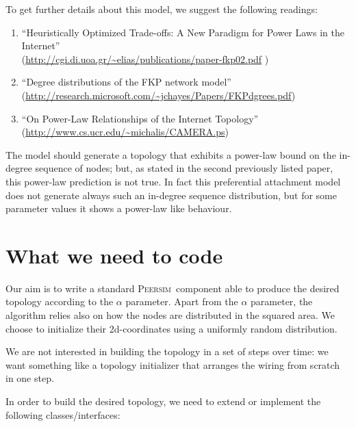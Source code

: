 \documentclass[a4paper,11pt]{article}
\newcommand{\id}[1]{{\scshape\small #1}}
\newcommand{\psim}{\id{Peersim}}
\begin{document}
To get further details about this model, we suggest the following
readings:

\begin{enumerate}

\item ``Heuristically Optimized Trade-offs: A New Paradigm for Power
Laws in the Internet'' \\
(\url{http://cgi.di.uoa.gr/~elias/publications/paper-fkp02.pdf} )

\item  ``Degree distributions
of the FKP network model'' \\
(\url{http://research.microsoft.com/~jchayes/Papers/FKPdgrees.pdf}) 

\item ``On Power-Law
Relationships of the Internet Topology''\\
(\url{http://www.cs.ucr.edu/~michalis/CAMERA.ps})

\end{enumerate}

The model should generate a topology that exhibits a power-law bound
on the in-degree sequence of nodes; but, as stated in the second
previously listed paper, this power-law prediction is not true. In fact
this preferential attachment model does not generate always such an
in-degree sequence 
distribution, but for some parameter values it shows a power-law like
behaviour. 

\section{What we need to code}
\label{s:coding}

Our aim is to write a standard \psim~component able to produce the
desired topology according to the $\alpha$ parameter. Apart from the
$\alpha$ parameter, the algorithm relies also on how the nodes are
distributed in the squared area. We choose to initialize their
2d-coordinates using a uniformly random distribution.

We are not interested
in building the topology in a set of steps over time: we want
something like a topology initializer that arranges the wiring from scratch in
one step.

In order to build the desired topology, we need to extend or implement
the following classes/interfaces:  
\end{document}
